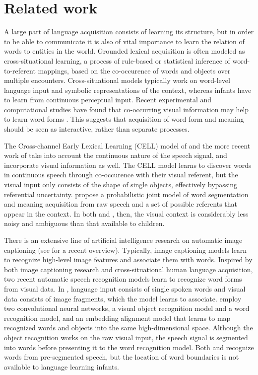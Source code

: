 \section{Related work}
A large part of language acquisition consists of learning its structure, but in order to be able to communicate it is also of vital importance to learn the relation of words to entities in the world. %
Grounded lexical acquisition is often modeled as cross-situational learning, a process of rule-based \cite{siskind.96} or statistical inference \cite{fazly.etal.10csj, frank.etal.07} of word-to-referent mappings, based on the co-occurence of words and objects over multiple encounters. 
Cross-situational models typically work on word-level language input and symbolic representations of the context, whereas infants have to learn from continuous perceptual input. Recent experimental and computational studies have found that co-occurring visual information may help to learn word forms \cite{thiessen2010effects, Cunillera2010295, Glicksohn2013, Yurofsky2012statistical}. This suggests that acquisition of word form and meaning should be seen as interactive, rather than separate processes.

The Cross-channel Early Lexical Learning (CELL) model of  and the more recent work of  take into account the continuous nature of the speech signal, and incorporate visual information as well. The CELL model learns to discover words in continuous speech through co-occurence with their visual referent, but the visual input only consists of the shape of single objects, effectively bypassing referential uncertainty.  propose a probabilistic joint model of word segmentation and meaning acquisition from raw speech and a set of possible referents that appear in the context. In both  and , then, the visual context is considerably less noisy and ambiguous than that available to children.

There is an extensive line of artificial intelligence research on automatic image captioning (see  for a recent overview). Typically, image captioning models learn to recognize high-level image features and associate them with words. Inspired by both image captioning research and cross-situational human language acquisition, two recent automatic speech recognition models learn to recognize word forms from visual data. In , language input consists of single spoken words and visual data consists of image fragments, which the model learns to associate.  employ two convolutional neural networks, a visual object recognition model and a word recognition model, and an embedding alignment model that learns to map recognized words and objects into the same high-dimensional space. Although the object recognition works on the raw visual input, the speech signal is segmented into words before presenting it to the word recognition model. Both  and  recognize words from pre-segmented speech, but the location of word boundaries is not available to language learning infants.

